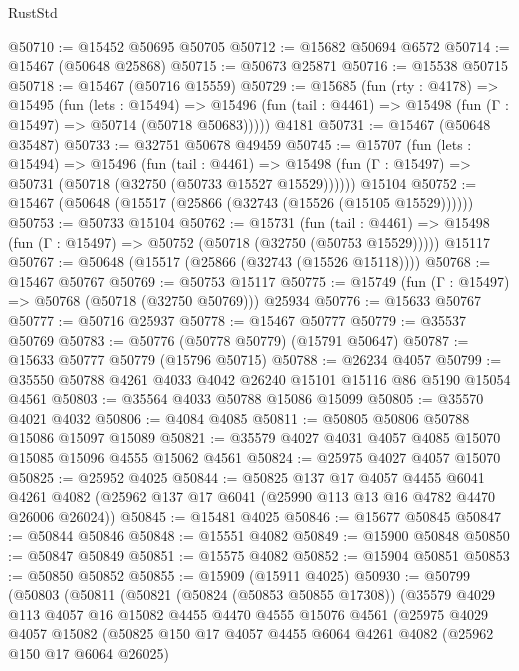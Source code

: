 \begin{lexlean}{RustStd}
\begin{coremodule}
@50710 := @15452 @50695 @50705
@50712 := @15682 @50694 @6572
@50714 := @15467 (@50648 @25868)
@50715 := @50673 @25871
@50716 := @15538 @50715
@50718 := @15467 (@50716 @15559)
@50729 := @15685
    (fun (rty : @4178) =>
    @15495
      (fun (lets : @15494) =>
      @15496 (fun (tail : @4461) => @15498 (fun (Γ : @15497) => @50714 (@50718 @50683)))))
    @4181
@50731 := @15467 (@50648 @35487)
@50733 := @32751 @50678 @49459
@50745 := @15707
    (fun (lets : @15494) =>
    @15496
      (fun (tail : @4461) =>
      @15498 (fun (Γ : @15497) => @50731 (@50718 (@32750 (@50733 @15527 @15529))))))
    @15104
@50752 := @15467 (@50648 (@15517 (@25866 (@32743 (@15526 (@15105 @15529))))))
@50753 := @50733 @15104
@50762 := @15731
    (fun (tail : @4461) => @15498 (fun (Γ : @15497) => @50752 (@50718 (@32750 (@50753 @15529)))))
    @15117
@50767 := @50648 (@15517 (@25866 (@32743 (@15526 @15118))))
@50768 := @15467 @50767
@50769 := @50753 @15117
@50775 := @15749 (fun (Γ : @15497) => @50768 (@50718 (@32750 @50769))) @25934
@50776 := @15633 @50767
@50777 := @50716 @25937
@50778 := @15467 @50777
@50779 := @35537 @50769
@50783 := @50776 (@50778 @50779) (@15791 @50647)
@50787 := @15633 @50777 @50779 (@15796 @50715)
@50788 := @26234 @4057
@50799 := @35550 @50788 @4261 @4033 @4042 @26240 @15101 @15116 @86 @5190 @15054 @4561
@50803 := @35564 @4033 @50788 @15086 @15099
@50805 := @35570 @4021 @4032
@50806 := @4084 @4085
@50811 := @50805 @50806 @50788 @15086 @15097 @15089
@50821 := @35579 @4027 @4031 @4057 @4085 @15070 @15085 @15096 @4555 @15062 @4561
@50824 := @25975 @4027 @4057 @15070
@50825 := @25952 @4025
@50844 := @50825
    @137
    @17
    @4057
    @4455
    @6041
    @4261
    @4082
    (@25962 @137 @17 @6041 (@25990 @113 @13 @16 @4782 @4470 @26006 @26024))
@50845 := @15481 @4025
@50846 := @15677 @50845
@50847 := @50844 @50846
@50848 := @15551 @4082
@50849 := @15900 @50848
@50850 := @50847 @50849
@50851 := @15575 @4082
@50852 := @15904 @50851
@50853 := @50850 @50852
@50855 := @15909 (@15911 @4025)
@50930 := @50799
    (@50803
      (@50811
        (@50821
          (@50824 (@50853 @50855 @17308))
          (@35579
            @4029
            @113
            @4057
            @16
            @15082
            @4455
            @4470
            @4555
            @15076
            @4561
            (@25975
              @4029
              @4057
              @15082
              (@50825
                @150
                @17
                @4057
                @4455
                @6064
                @4261
                @4082
                (@25962 @150 @17 @6064 @26025)

\end{coremodule}
\end{lexlean}

